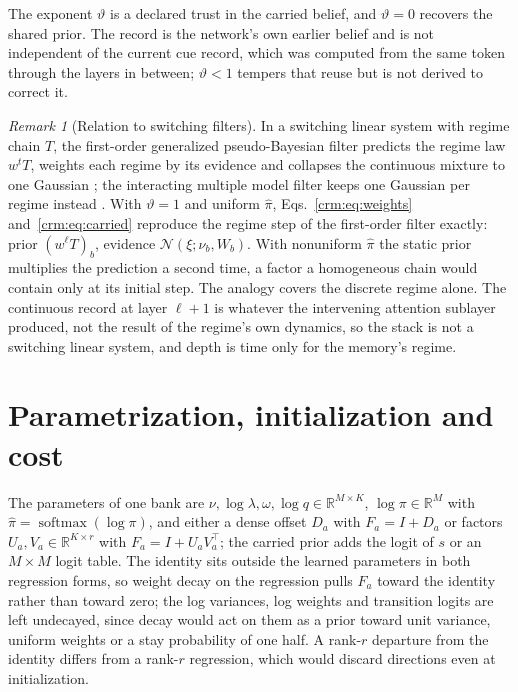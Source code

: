 \documentclass[11pt]{article}
\theoremstyle{definition}
\theoremstyle{remark}
\newtheorem{remark}[theorem]{Remark}
\newcommand{\R}{\mathbb R}
\newcommand{\Gauss}{\mathcal N}
\newcommand{\softmax}{\operatorname{softmax}}
\newcommand{\pihat}{\hat\pi}
\begin{document}
The exponent $\vartheta$ is a declared trust in the carried belief, and $\vartheta=0$ recovers the shared prior. The record is the network's own earlier belief and is not independent of the current cue record, which was computed from the same token through the layers in between; $\vartheta<1$ tempers that reuse but is not derived to correct it.

\begin{remark}[Relation to switching filters]
\label{crm:rem:gpb}
In a switching linear system with regime chain $T$, the first-order generalized pseudo-Bayesian filter predicts the regime law $w^tT$, weights each regime by its evidence and collapses the continuous mixture to one Gaussian \citep{AckersonFu1970Switching}; the interacting multiple model filter keeps one Gaussian per regime instead \citep{BlomBarShalom1988IMM}. With $\vartheta=1$ and uniform $\pihat$, Eqs.~\eqref{crm:eq:weights} and~\eqref{crm:eq:carried} reproduce the regime step of the first-order filter exactly: prior $(w^\ell T)_b$, evidence $\Gauss(\xi;\nu_b,W_b)$. With nonuniform $\pihat$ the static prior multiplies the prediction a second time, a factor a homogeneous chain would contain only at its initial step. The analogy covers the discrete regime alone. The continuous record at layer $\ell+1$ is whatever the intervening attention sublayer produced, not the result of the regime's own dynamics, so the stack is not a switching linear system, and depth is time only for the memory's regime.
\end{remark}

\section{Parametrization, initialization and cost}
\label{crm:sec:param}

The parameters of one bank are $\nu,\log\lambda,\omega,\log q\in\R^{M\times K}$, $\log\pi\in\R^M$ with $\pihat=\softmax(\log\pi)$, and either a dense offset $D_a$ with $F_a=I+D_a$ or factors $U_a,V_a\in\R^{K\times r}$ with $F_a=I+U_aV_a^\top$; the carried prior adds the logit of $s$ or an $M\times M$ logit table. The identity sits outside the learned parameters in both regression forms, so weight decay on the regression pulls $F_a$ toward the identity rather than toward zero; the log variances, log weights and transition logits are left undecayed, since decay would act on them as a prior toward unit variance, uniform weights or a stay probability of one half. A rank-$r$ departure from the identity differs from a rank-$r$ regression, which would discard directions even at initialization.
\end{document}
